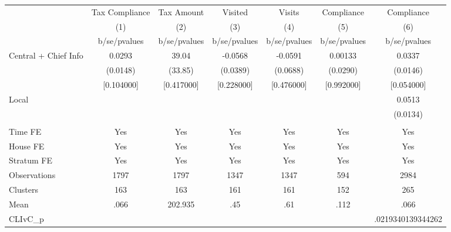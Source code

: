 \begin{tabular}{l*{6}{c}}
\toprule
                &\multicolumn{1}{c}{Tax Compliance}&\multicolumn{1}{c}{Tax Amount}&\multicolumn{1}{c}{Visited}&\multicolumn{1}{c}{Visits}&\multicolumn{1}{c}{Compliance}&\multicolumn{1}{c}{Compliance}\\
                &\multicolumn{1}{c}{(1)}&\multicolumn{1}{c}{(2)}&\multicolumn{1}{c}{(3)}&\multicolumn{1}{c}{(4)}&\multicolumn{1}{c}{(5)}&\multicolumn{1}{c}{(6)}\\
                &b/se/pvalues&b/se/pvalues&b/se/pvalues&b/se/pvalues&b/se/pvalues&b/se/pvalues\\
\midrule
Central + Chief Info&   0.0293&    39.04&  -0.0568&  -0.0591&  0.00133&   0.0337\\
                & (0.0148)&  (33.85)& (0.0389)& (0.0688)& (0.0290)& (0.0146)\\
                &[0.104000]&[0.417000]&[0.228000]&[0.476000]&[0.992000]&[0.054000]\\
Local           &         &         &         &         &         &   0.0513\\
                &         &         &         &         &         & (0.0134)\\
                &         &         &         &         &         &         \\
Time FE         &      Yes&      Yes&      Yes&      Yes&      Yes&      Yes\\
House FE        &      Yes&      Yes&      Yes&      Yes&      Yes&      Yes\\
Stratum FE      &      Yes&      Yes&      Yes&      Yes&      Yes&      Yes\\
\midrule
Observations    &     1797&     1797&     1347&     1347&      594&     2984\\
Clusters        &      163&      163&      161&      161&      152&      265\\
Mean            &     .066&  202.935&      .45&      .61&     .112&     .066\\
CLIvC\_p         &         &         &         &         &         &.0219340139344262\\
\bottomrule
\end{tabular}

